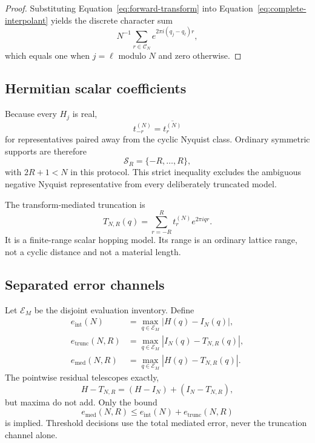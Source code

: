\documentclass[11pt]{article}
\begin{document}
\begin{proof}
Substituting Equation~\eqref{eq:forward-transform} into
Equation~\eqref{eq:complete-interpolant} yields the discrete character sum
\begin{equation*}
 N^{-1}\sum_{r\in\mathcal C_N}e^{2\pi i(q_j-q_\ell)r},
\end{equation*}
which equals one when $j=\ell$ modulo $N$ and zero otherwise.
\end{proof}

\subsection{Hermitian scalar coefficients}

Because every $H_j$ is real,
\begin{equation}
 t_{-r}^{(N)}=\overline{t_r^{(N)}}
 \label{eq:hermitian-symmetry}
\end{equation}
for representatives paired away from the cyclic Nyquist class.  Ordinary symmetric
supports are therefore
\begin{equation}
 \mathcal S_R=\{-R,\ldots,R\},
\end{equation}
with $2R+1<N$ in this protocol.  This strict inequality excludes the ambiguous negative
Nyquist representative from every deliberately truncated model.

The transform-mediated truncation is
\begin{equation}
 T_{N,R}(q)=\sum_{r=-R}^{R}t_r^{(N)}e^{2\pi iqr}.
 \label{eq:truncated-interpolant}
\end{equation}
It is a finite-range scalar hopping model.  Its range is an ordinary lattice range, not
a cyclic distance and not a material length.

\subsection{Separated error channels}

Let $\mathcal E_M$ be the disjoint evaluation inventory.  Define
\begin{align}
 e_{\mathrm{int}}(N)&=\max_{q\in\mathcal E_M}|H(q)-I_N(q)|,\\
 e_{\mathrm{trunc}}(N,R)&=\max_{q\in\mathcal E_M}|I_N(q)-T_{N,R}(q)|,\\
 e_{\mathrm{med}}(N,R)&=\max_{q\in\mathcal E_M}|H(q)-T_{N,R}(q)|.
 \label{eq:error-channels}
\end{align}
The pointwise residual telescopes exactly,
\begin{equation}
 H-T_{N,R}=(H-I_N)+(I_N-T_{N,R}),
\end{equation}
but maxima do not add.  Only the bound
\begin{equation}
 e_{\mathrm{med}}(N,R)\le e_{\mathrm{int}}(N)+e_{\mathrm{trunc}}(N,R)
 \label{eq:triangle}
\end{equation}
is implied.  Threshold decisions use the total mediated error, never the truncation
channel alone.
\end{document}
